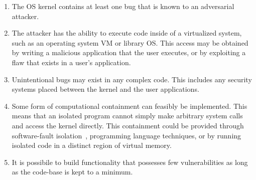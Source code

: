\begin{enumerate}
\item The OS kernel contains at least one bug that is known to an adversarial attacker.

\item The attacker has the ability to execute code inside
of a virtualized system, such as an operating system VM or library OS.
This access may be obtained by writing a malicious application
that the user executes, or by exploiting a flaw that exists in a user's
application.

\item Unintentional bugs may exist in any complex code. This
includes any security systems placed between the kernel and the user
applications.

\item Some form of computational containment can feasibly be implemented.
This means that an isolated program cannot simply
make arbitrary system calls and access the kernel directly. This containment could
be provided through software-fault isolation~\cite{SFI:93}, programming
language techniques, or by running isolated code in a
distinct region of virtual memory.

\item It is possibile to build functionality that possesses few
vulnerabilities as long as the code-base is kept to a minimum.


\end{enumerate}